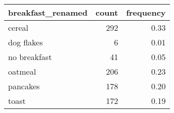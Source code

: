 \begin{table}[!h]
\centering
\begin{tabular}[t]{lrr}
\toprule
breakfast\_renamed & count & frequency\\
\midrule
cereal & 292 & 0.33\\
dog flakes & 6 & 0.01\\
no breakfast & 41 & 0.05\\
oatmeal & 206 & 0.23\\
pancakes & 178 & 0.20\\
\addlinespace
toast & 172 & 0.19\\
\bottomrule
\end{tabular}
\end{table}

